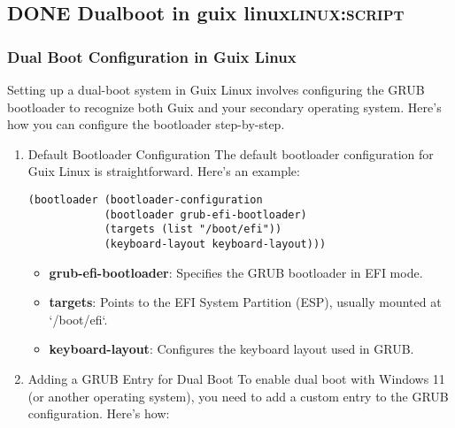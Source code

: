 \documentclass[11pt]{article}
\begin{document}
\subsection{{\bfseries\sffamily DONE} Dualboot in guix linux\hfill{}\textsc{linux:script}}
\label{sec:org2195954}
\subsubsection{Dual Boot Configuration in Guix Linux}
\label{sec:orgb367850}
Setting up a dual-boot system in Guix Linux involves configuring the GRUB bootloader to recognize both Guix and your secondary operating system. Here's how you can configure the bootloader step-by-step.
\begin{enumerate}
\item Default Bootloader Configuration
\label{sec:orge5697e6}
The default bootloader configuration for Guix Linux is straightforward. Here's an example:

\begin{verbatim}
(bootloader (bootloader-configuration
            (bootloader grub-efi-bootloader)
            (targets (list "/boot/efi"))
            (keyboard-layout keyboard-layout)))
\end{verbatim}

\begin{itemize}
\item \textbf{grub-efi-bootloader}: Specifies the GRUB bootloader in EFI mode.
\item \textbf{targets}: Points to the EFI System Partition (ESP), usually mounted at `/boot/efi`.
\item \textbf{keyboard-layout}: Configures the keyboard layout used in GRUB.
\end{itemize}
\item Adding a GRUB Entry for Dual Boot
\label{sec:org93b3f49}
To enable dual boot with Windows 11 (or another operating system), you need to add a custom entry to the GRUB configuration. Here’s how:


\end{enumerate}
\end{document}
